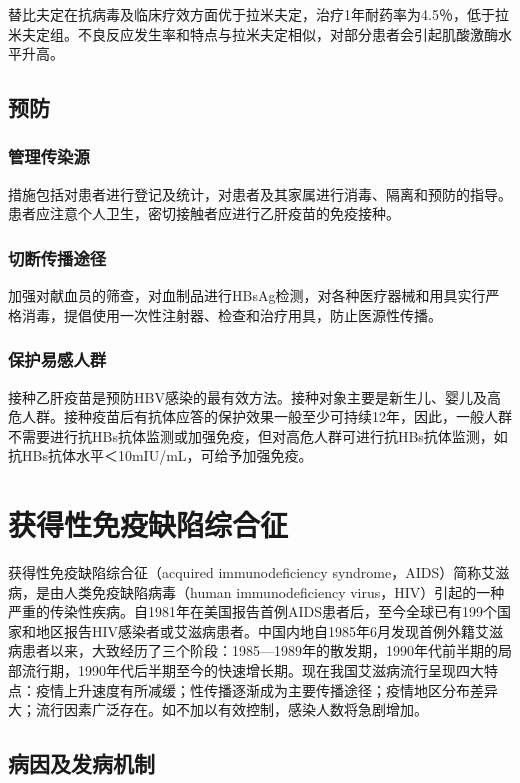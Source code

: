 替比夫定在抗病毒及临床疗效方面优于拉米夫定，治疗1年耐药率为4.5％，低于拉米夫定组。不良反应发生率和特点与拉米夫定相似，对部分患者会引起肌酸激酶水平升高。

\subsection{预防}

\subsubsection{管理传染源}

措施包括对患者进行登记及统计，对患者及其家属进行消毒、隔离和预防的指导。患者应注意个人卫生，密切接触者应进行乙肝疫苗的免疫接种。

\subsubsection{切断传播途径}

加强对献血员的筛查，对血制品进行HBsAg检测，对各种医疗器械和用具实行严格消毒，提倡使用一次性注射器、检查和治疗用具，防止医源性传播。

\subsubsection{保护易感人群}

接种乙肝疫苗是预防HBV感染的最有效方法。接种对象主要是新生儿、婴儿及高危人群。接种疫苗后有抗体应答的保护效果一般至少可持续12年，因此，一般人群不需要进行抗HBs抗体监测或加强免疫，但对高危人群可进行抗HBs抗体监测，如抗HBs抗体水平＜10mIU/mL，可给予加强免疫。

\section{获得性免疫缺陷综合征}

获得性免疫缺陷综合征（acquired immunodeficiency
syndrome，AIDS）简称艾滋病，是由人类免疫缺陷病毒（human immunodeficiency
virus，HIV）引起的一种严重的传染性疾病。自1981年在美国报告首例AIDS患者后，至今全球已有199个国家和地区报告HIV感染者或艾滋病患者。中国内地自1985年6月发现首例外籍艾滋病患者以来，大致经历了三个阶段：1985---1989年的散发期，1990年代前半期的局部流行期，1990年代后半期至今的快速增长期。现在我国艾滋病流行呈现四大特点：疫情上升速度有所减缓；性传播逐渐成为主要传播途径；疫情地区分布差异大；流行因素广泛存在。如不加以有效控制，感染人数将急剧增加。

\subsection{病因及发病机制}

